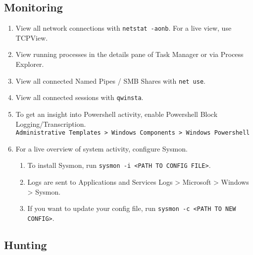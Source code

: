 \documentclass[12pt,letterpaper]{article}
\def\code#1{\textcolor{c2}{\texttt{#1}}}
\begin{document}
\pagebreak

\subsection{Monitoring}

\begin{enumerate}
	\item View all network connections with \code{netstat -aonb}. For a live view, use TCPView.
	\item View running processes in the details pane of Task Manager or via Process Explorer.
	\item View all connected Named Pipes / SMB Shares with \code{net use}.
	\item View all connected sessions with \code{qwinsta}.
	\item To get an insight into Powershell activity, enable Powershell Block Logging/Transcription. \\
		\code{Administrative Templates > Windows Components > Windows Powershell}
	\item For a live overview of system activity, configure Sysmon.
	\begin{enumerate}
		\item To install Sysmon, run \code{sysmon -i <PATH TO CONFIG FILE>}.
		\item Logs are sent to Applications and Services Logs > Microsoft > Windows > Sysmon.
		\item If you want to update your config file, run \code{sysmon -c <PATH TO NEW CONFIG>}. 
	\end{enumerate}
\end{enumerate}

\subsection{Hunting}
\end{document}
